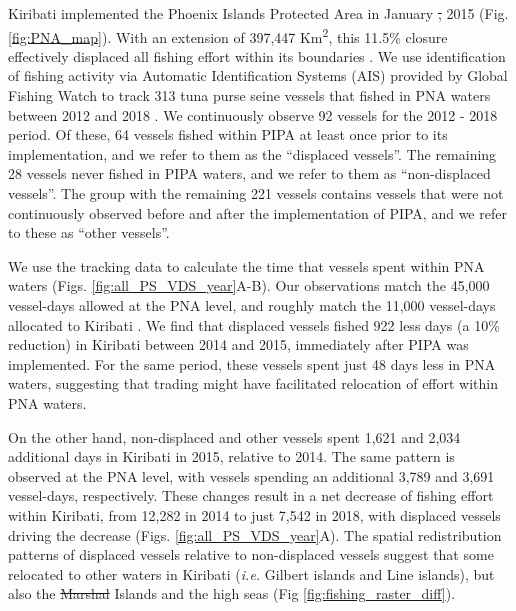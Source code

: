 \documentclass[12pt]{article}
\providecommand{\DIFaddtex}[1]{{\protect\color{blue}\uwave{#1}}} %
\providecommand{\DIFdeltex}[1]{{\protect\color{red}\sout{#1}}}                      %
\providecommand{\DIFaddbegin}{} %
\providecommand{\DIFaddend}{} %
\providecommand{\DIFdelbegin}{} %
\providecommand{\DIFdelend}{} %
\providecommand{\DIFadd}[1]{\texorpdfstring{\DIFaddtex{#1}}{#1}} %
\providecommand{\DIFdel}[1]{\texorpdfstring{\DIFdeltex{#1}}{}} %
\newcommand{\DIFscaledelfig}{0.5}
\newlength{\DIFdelgraphicswidth} %
\newlength{\DIFdelgraphicsheight} %
\newcommand{\DIFaddincludegraphics}[2][]{{\color{blue}\fbox{\DIFOincludegraphics[#1]{#2}}}} %
\newcommand{\DIFdelincludegraphics}[2][]{%
\sbox{\DIFdelgraphicsbox}{\DIFOincludegraphics[#1]{#2}}%
\settoboxwidth{\DIFdelgraphicswidth}{\DIFdelgraphicsbox} %
\settoboxtotalheight{\DIFdelgraphicsheight}{\DIFdelgraphicsbox} %
\scalebox{\DIFscaledelfig}{%
\parbox[b]{\DIFdelgraphicswidth}{\usebox{\DIFdelgraphicsbox}\\[-\baselineskip] \rule{\DIFdelgraphicswidth}{0em}}\llap{\resizebox{\DIFdelgraphicswidth}{\DIFdelgraphicsheight}{%
\setlength{\unitlength}{\DIFdelgraphicswidth}%
\begin{picture}(1,1)%
\thicklines\linethickness{2pt} %
{\color[rgb]{1,0,0}\put(0,0){\framebox(1,1){}}}%
{\color[rgb]{1,0,0}\put(0,0){\line( 1,1){1}}}%
{\color[rgb]{1,0,0}\put(0,1){\line(1,-1){1}}}%
\end{picture}%
}\hspace*{3pt}}} %
} %
\DeclareRobustCommand{\DIFaddbegin}{\DIFOaddbegin \let\includegraphics\DIFaddincludegraphics} %
\DeclareRobustCommand{\DIFaddend}{\DIFOaddend \let\includegraphics\DIFOincludegraphics} %
\DeclareRobustCommand{\DIFdelbegin}{\DIFOdelbegin \let\includegraphics\DIFdelincludegraphics} %
\DeclareRobustCommand{\DIFdelend}{\DIFOaddend \let\includegraphics\DIFOincludegraphics} %
\begin{document}
Kiribati implemented the Phoenix Islands Protected Area in January \DIFdelbegin \DIFdel{, }\DIFdelend 2015 (Fig. \ref{fig:PNA_map}). With an extension of 397,447 Km\textsuperscript{2}, this 11.5\% closure effectively displaced all fishing effort within its boundaries \cite{mccauley_2016,mcdermott_2018}. We use identification of fishing activity via Automatic Identification Systems (AIS) provided by Global Fishing Watch to track 313 tuna purse seine vessels that fished in PNA waters between 2012 and 2018 \cite{kroodsma_2018}. We continuously observe 92 vessels for the 2012 - 2018 period. Of these, 64 vessels fished within PIPA at least once prior to its implementation, and we refer to them as the ``displaced vessels''. The remaining 28 vessels never fished in PIPA waters, and we refer to them as ``non-displaced vessels''. The group with the remaining 221 vessels contains vessels that were not continuously observed before and after the implementation of PIPA, and we refer to these as ``other vessels''.

We use the tracking data to calculate the time that vessels spent within PNA waters (Figs. \ref{fig:all_PS_VDS_year}A-B). Our observations match the 45,000 vessel-days allowed at the PNA level, and roughly match the 11,000 vessel-days \DIFaddbegin \DIFadd{historically }\DIFaddend allocated to Kiribati \cite{yeeting2018stabilising}. We find that displaced vessels fished 922 less days (a 10\% reduction) in Kiribati between 2014 and 2015, immediately after PIPA was implemented. For the same period, these vessels spent just 48 days less in PNA waters, suggesting that trading might have facilitated relocation of effort within PNA waters.

On the other hand, non-displaced and other vessels spent 1,621 and 2,034 additional days in Kiribati in 2015, relative to 2014. The same pattern is observed at the PNA level, with vessels spending an additional 3,789 and 3,691 vessel-days, respectively. These changes result in a net decrease of fishing effort within Kiribati, from 12,282 in 2014 to just 7,542 in 2018, with displaced vessels driving the decrease (Figs. \ref{fig:all_PS_VDS_year}A). The spatial redistribution patterns of displaced vessels relative to non-displaced vessels suggest that some relocated to other waters in Kiribati (\emph{i.e.} \DIFaddbegin \DIFadd{the }\DIFaddend Gilbert islands and Line islands), but also the \DIFdelbegin \DIFdel{Marshal }\DIFdelend \DIFaddbegin \DIFadd{Marshall }\DIFaddend Islands and the high seas (Fig \ref{fig:fishing_raster_diff}).
\end{document}
